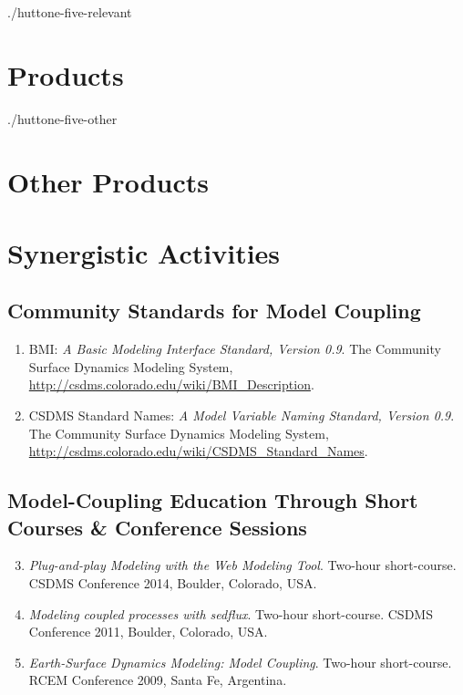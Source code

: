 \documentclass[letterpaper]{resume}
\begin{document}
\begin{btSect}{./huttone-five-relevant}
\section{Products}
\btPrintNotCited
\end{btSect}

\begin{btSect}{./huttone-five-other}
\section{Other Products}
\btPrintNotCited
\end{btSect}

\section{Synergistic Activities}
\renewcommand{\labelenumi}{[\arabic{enumi}]}

\subsection {Community Standards for Model Coupling}
\begin{enumerate}
  \setcounter{enumi}{0}
  \item BMI: \textit {A Basic Modeling Interface Standard, Version 0.9}. The Community Surface Dynamics Modeling System,
        \url {http://csdms.colorado.edu/wiki/BMI_Description}.
  \item CSDMS Standard Names: \textit {A Model Variable Naming Standard, Version 0.9}. The Community Surface Dynamics Modeling System,
        \url {http://csdms.colorado.edu/wiki/CSDMS_Standard_Names}.
\end{enumerate}

\subsection {Model-Coupling Education Through Short Courses \& Conference Sessions}
\begin{enumerate}
  \setcounter{enumi}{2}
  \item \textit {Plug-and-play Modeling with the Web Modeling Tool}. Two-hour short-course. CSDMS Conference 2014, Boulder, Colorado, USA.
  \item \textit {Modeling coupled processes with sedflux}. Two-hour short-course. CSDMS Conference 2011, Boulder, Colorado, USA.
  \item \textit {Earth-Surface Dynamics Modeling: Model Coupling}. Two-hour short-course. RCEM Conference 2009, Santa Fe, Argentina.
\end{enumerate}
\end{document}
